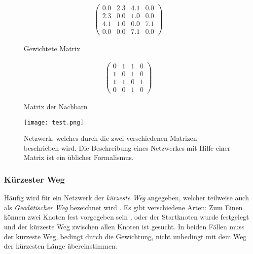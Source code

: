 \documentclass[fontsize=11pt, twoside, a4paper]{scrartcl}
\begin{document}
\begin{figure}[H]
\centering
	\begin{minipage}[t]{0.3\textwidth}
		\begin{align*}
		\left(
	\begin{matrix}
		0.0 & 2.3 & 4.1 & 0.0\\
		2.3 & 0.0 & 1.0 & 0.0\\
		4.1 & 1.0 & 0.0 & 7.1\\
		0.0 & 0.0 & 7.1 & 0.0
	\end{matrix}	
	\right)
		\end{align*}
		\caption*{Gewichtete Matrix}
	\end{minipage}
	\begin{minipage}[t]{0.3\textwidth}
		\begin{align*}
		\left(
	\begin{matrix}
		0 & 1 & 1 & 0\\
		1 & 0 & 1 & 0\\
		1 & 1 & 0 & 1\\
		0 & 0 & 1 & 0
	\end{matrix}
	\right)
		\end{align*}
		\caption*{Matrix der Nachbarn}
	\end{minipage}		
\end{figure}
\begin{figure}[H]
	\centering
		\texttt{[image: test.png]}
	\caption{Netzwerk, welches durch die zwei verschiedenen Matrizen beschrieben wird. Die Beschreibung eines Netzwerkes mit Hilfe einer Matrix ist ein üblicher Formalismus.}
\end{figure}

\subsubsection*{Kürzester Weg}
Häufig wird für ein Netzwerk der \textit{kürzeste Weg} angegeben, welcher teilweise auch als \textit{Geodätischer Weg} bezeichnet wird \cite{Newman}. Es gibt verschiedene Arten: Zum Einen können zwei Knoten fest vorgegeben sein \cite{ShortestPath}, oder der Startknoten wurde festgelegt und der kürzeste Weg zwischen allen Knoten ist gesucht. In beiden Fällen muss der kürzeste Weg, bedingt durch die Gewichtung, nicht unbedingt mit dem Weg der kürzesten Länge übereinstimmen. 
\end{document}
